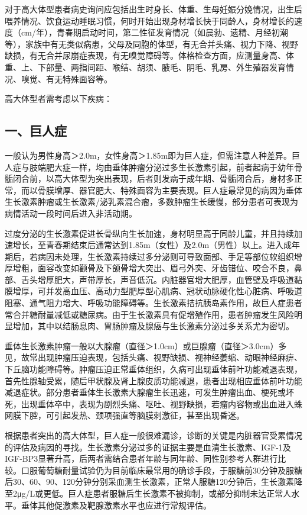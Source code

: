 对于高大体型患者病史询问应包括出生时身长、体重、生母妊娠分娩情况，出生后喂养情况、饮食运动睡眠习惯，何时开始出现身材增长快于同龄人，身材增长的速度（cm/年），青春期启动时间，第二性征发育情况（如晨勃、遗精、月经初潮等），家族中有无类似病患，父母及同胞的体型，有无合并头痛、视力下降、视野缺损，有无合并尿崩症表现，有无嗅觉障碍等。体格检查方面，应测量身高、体重、上、下部量、两指间距、喉结、胡须、腋毛、阴毛、乳房、外生殖器发育情况、嗅觉、有无特殊面容等。

高大体型者需考虑以下疾病：

\subsection{一、巨人症}

一般认为男性身高＞2.0m，女性身高＞1.85m即为巨人症，但需注意人种差异。巨人症与肢端肥大症一样，均由垂体肿瘤分泌过多生长激素引起，前者起病于幼年骨骺闭合前，以高大体型为突出表现，后者则发病于成年期、骨骺闭合后，身材多正常，而以骨膜增厚、器官肥大、特殊面容为主要表现。巨人症最常见的病因为垂体生长激素肿瘤或生长激素/泌乳素混合瘤，多数肿瘤生长缓慢，部分患者可表现为病情活动一段时间后进入非活动期。

过度分泌的生长激素促进长骨纵向生长加速，身材明显高于同龄儿童，并且持续加速增长，至青春期结束后通常达到1.85m（女性）及2.0m（男性）以上。进入成年期后，若病因未处理，生长激素持续过多分泌则可导致面部、手足等部位软组织增厚增粗，面容改变如颧骨及下颌骨增大突出、眉弓外突、牙齿错位、咬合不良，鼻部、舌头增厚肥大，声带厚长，声音低沉。内脏器官增大肥厚，血管壁及呼吸道黏膜增厚，可并发高血压、高动力型肥厚型心肌病、冠状动脉硬化性心脏病、呼吸道阻塞、通气阻力增大、呼吸功能障碍等。生长激素拮抗胰岛素作用，故巨人症患者常合并糖耐量减低或糖尿病。由于生长激素具有促增殖作用，患者肿瘤发生风险明显增加，其中以结肠息肉、胃肠肿瘤及腺癌与生长激素分泌过多关系尤为密切。

垂体生长激素肿瘤一般以大腺瘤（直径＞1.0cm）或巨腺瘤（直径＞3.0cm）多见，故常出现肿瘤压迫表现，包括头痛、视野缺损、视神经萎缩、动眼神经麻痹、下丘脑功能障碍等。肿瘤压迫正常垂体组织，久病可出现垂体前叶功能减退表现，首先性腺轴受累，随后甲状腺及肾上腺皮质功能减退，患者出现相应垂体前叶功能减退症状。部分患者垂体生长激素大腺瘤生长迅速，可发生肿瘤出血、梗死或坏死，出现垂体卒中，表现为剧烈头痛、呕吐、视野缺损，若瘤内容物或出血进入蛛网膜下腔，可引起发热、颈项强直等脑膜刺激征，甚至出现昏迷。

根据患者突出的高大体型，巨人症一般很难漏诊，诊断的关键是内脏器官受累情况的评估及病因的寻找。生长激素分泌过多的证据主要是血清生长激素、IGF-1及IGF-BP3显著升高，后两者需结合患者年龄与同年龄、同性别参考人群进行比较。口服葡萄糖耐量试验仍为目前临床最常用的确诊手段，于服糖前30分钟及服糖后30、60、90、120分钟分别采血测生长激素，正常人服糖120分钟后，生长激素降至2μg/L或更低。巨人症患者服糖后生长激素不被抑制，或部分抑制未达正常人水平。垂体其他促激素及靶腺激素水平也应进行常规评估。

